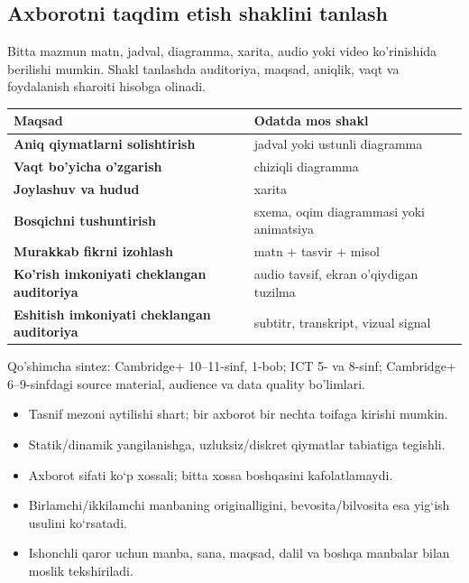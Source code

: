 \documentclass[11pt,a4paper,oneside]{book}
\newcommand{\sourcecite}[1]{\begin{sourcebox}\small #1\end{sourcebox}}
\begin{document}
\subsection{Axborotni taqdim etish shaklini tanlash}
Bitta mazmun matn, jadval, diagramma, xarita, audio yoki video ko'rinishida berilishi mumkin. Shakl tanlashda auditoriya, maqsad, aniqlik, vaqt va foydalanish sharoiti hisobga olinadi.

\begin{tabularx}{\textwidth}{>{\sffamily\bfseries}p{}X}
\toprule
Maqsad & Odatda mos shakl\\
\midrule
Aniq qiymatlarni solishtirish & jadval yoki ustunli diagramma\\
Vaqt bo'yicha o'zgarish & chiziqli diagramma\\
Joylashuv va hudud & xarita\\
Bosqichni tushuntirish & sxema, oqim diagrammasi yoki animatsiya\\
Murakkab fikrni izohlash & matn + tasvir + misol\\
Ko'rish imkoniyati cheklangan auditoriya & audio tavsif, ekran o'qiydigan tuzilma\\
Eshitish imkoniyati cheklangan auditoriya & subtitr, transkript, vizual signal\\
\bottomrule
\end{tabularx}

\sourcecite{Qo'shimcha sintez: Cambridge+ 10--11-sinf, 1-bob; ICT 5- va 8-sinf; Cambridge+ 6--9-sinfdagi source material, audience va data quality bo'limlari.}

\begin{recapbox}
\begin{itemize}
\item Tasnif mezoni aytilishi shart; bir axborot bir nechta toifaga kirishi mumkin.
\item Statik/dinamik yangilanishga, uzluksiz/diskret qiymatlar tabiatiga tegishli.
\item Axborot sifati ko‘p xossali; bitta xossa boshqasini kafolatlamaydi.
\item Birlamchi/ikkilamchi manbaning originalligini, bevosita/bilvosita esa yig‘ish usulini ko‘rsatadi.
\item Ishonchli qaror uchun manba, sana, maqsad, dalil va boshqa manbalar bilan moslik tekshiriladi.
\end{itemize}
\end{recapbox}
\end{document}
